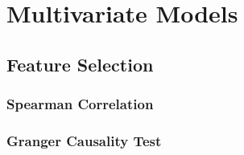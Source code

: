 \section{Multivariate Models}

\subsection{Feature Selection}
\subsubsection{Spearman Correlation}

\subsubsection{Granger Causality Test}
